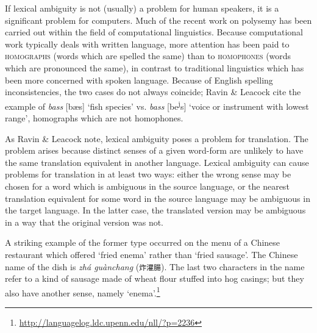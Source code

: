 If lexical ambiguity is not (usually) a problem for human speakers, it is a significant problem for computers. Much of the recent work on polysemy has been carried out within the field of computational linguistics. Because computational work typically deals with written language, more attention has been paid to \textsc{homographs} (words which are spelled the same) than to \textsc{homophones} (words which are pronounced the same), in contrast to traditional linguistics which has been more concerned with spoken language. Because of English spelling inconsistencies, the two cases do not always coincide; Ravin \& Leacock cite the example of \textit{bass} [bæs] ‘fish species’ vs. \textit{bass} [be\textsuperscript{j}s] ‘voice or instrument with lowest range’, homographs which are not homophones.



As Ravin \& Leacock note, lexical ambiguity poses a problem for translation. The problem arises because distinct senses of a given word-form are unlikely to have the same translation equivalent in another language. Lexical ambiguity can cause problems for translation in at least two ways: either the wrong sense may be chosen for a word which is ambiguous in the source language, or the nearest translation equivalent for some word in the source language may be ambiguous in the target language. In the latter case, the translated version may be ambiguous in a way that the original version was not.



A striking example of the former type occurred on the menu of a Chinese restaurant which offered ‘fried enema’ rather than ‘fried sausage’. The Chinese name of the dish is \textit{zhá guànchang} (\texttt{炸灌腸}). The last two characters in the name refer to a kind of sausage made of wheat flour stuffed into hog casings; but they also have another sense, namely ‘enema’.\footnote{\url{http://languagelog.ldc.upenn.edu/nll/?p=2236}} 



